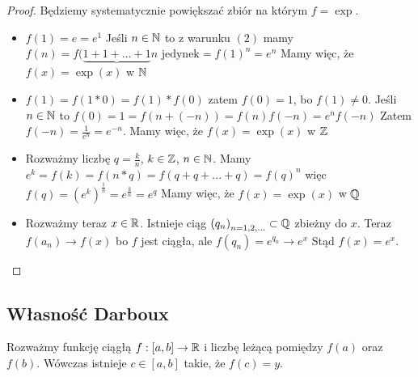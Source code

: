 \documentclass[9pt]{article}
\begin{document}
\begin{proof}
    Będziemy systematycznie powiększać zbiór na którym $f = \exp$.
    \begin{itemize}
        \item $f(1) = e = e^1$
            Jeśli $n \in \mathbb{N}$ to z warunku $(2)$ mamy
            $f(n) = f(\underbrace{1+1+...+1}{n \text{ jedynek}} = f(1)^n = e^n$
            Mamy więc, że $f(x) = \exp(x)$ w $\mathbb{N}$
        \item $f(1) = f(1*0) = f(1) * f(0)$ zatem $f(0) = 1$, bo $f(1) \ne 0$.
            Jeśli $n \in \mathbb{N}$ to $f(0) = 1 = f\left(n + (-n)\right) = f(n) f(-n) = e^n f(-n)$
            Zatem $f(-n) = \frac{1}{e^n} = e^{-n}$.
            Mamy więc, że $f(x) = \exp(x)$ w $\mathbb{Z}$
        \item Rozważmy liczbę $q = \frac{k}{n}$, $k \in \mathbb{Z}$, $n \in \mathbb{N}$.
            Mamy $e^k = f(k) = f(n*q) = f(q + q + ... + q) = f(q)^n$
            więc $f(q) = \left(e^k\right)^\frac{1}{n} = e^{\frac{k}{n}} = e^q$
            Mamy więc, że $f(x) = \exp(x)$ w $\mathbb{Q}$
        \item Rozważmy teraz $x \in \mathbb{R}$. Istnieje ciąg $\left(q_n\right)_{n = 1,2,...} \subset \mathbb{Q}$ zbieżny do $x$.
            Teraz $f(a_n) \to f(x)$ bo $f$ jest ciągła, ale $f(q_n) = e^{q_n} \to e^x$
            Stąd $f(x) = e^x$.
    \end{itemize}
\end{proof}

\subsection{Własność Darboux}

\begin{Twi}
    Rozważmy funkcję ciągłą $f: [a,b] \to \mathbb{R}$ i liczbę leżącą pomiędzy $f(a)$ oraz $f(b)$. Wówczas
    istnieje $c \in [a,b]$ takie, że $f(c) = y$.
\end{Twi}
\end{document}
